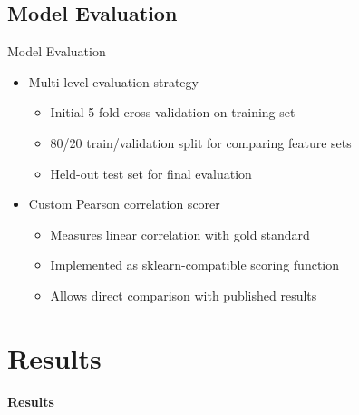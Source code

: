 \documentclass{beamer}
\begin{document}
\subsection{Model Evaluation}
\begin{frame}{Model Evaluation}
    \begin{itemize}
        \item Multi-level evaluation strategy
        \begin{itemize}
            \item Initial 5-fold cross-validation on training set
            \item 80/20 train/validation split for comparing feature sets
            \item Held-out test set for final evaluation
        \end{itemize}
        \item Custom Pearson correlation scorer
        \begin{itemize}
            \item Measures linear correlation with gold standard
            \item Implemented as sklearn-compatible scoring function
            \item Allows direct comparison with published results
        \end{itemize}
    \end{itemize}
\end{frame}

\section{Results}
\begin{frame}
    \begin{center}
        \Large \textbf{Results}
    \end{center}
\end{frame}
\end{document}
